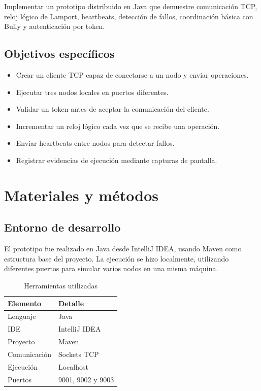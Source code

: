\documentclass[12pt,a4paper]{article}
\begin{document}
Implementar un prototipo distribuido en Java que demuestre comunicación TCP, reloj lógico de Lamport, heartbeats, detección de fallos, coordinación básica con Bully y autenticación por token.

\subsection{Objetivos específicos}

\begin{itemize}
    \item Crear un cliente TCP capaz de conectarse a un nodo y enviar operaciones.
    \item Ejecutar tres nodos locales en puertos diferentes.
    \item Validar un token antes de aceptar la comunicación del cliente.
    \item Incrementar un reloj lógico cada vez que se recibe una operación.
    \item Enviar heartbeats entre nodos para detectar fallos.
    \item Registrar evidencias de ejecución mediante capturas de pantalla.
\end{itemize}

\section{Materiales y métodos}

\subsection{Entorno de desarrollo}

El prototipo fue realizado en Java desde IntelliJ IDEA, usando Maven como estructura base del proyecto. La ejecución se hizo localmente, utilizando diferentes puertos para simular varios nodos en una misma máquina.

\begin{table}[H]
\centering
\caption{Herramientas utilizadas}
\begin{tabular}{ll}
\toprule
\textbf{Elemento} & \textbf{Detalle} \\
\midrule
Lenguaje & Java \\
IDE & IntelliJ IDEA \\
Proyecto & Maven \\
Comunicación & Sockets TCP \\
Ejecución & Localhost \\
Puertos & 9001, 9002 y 9003 \\
\bottomrule
\end{tabular}
\end{table}
\end{document}

